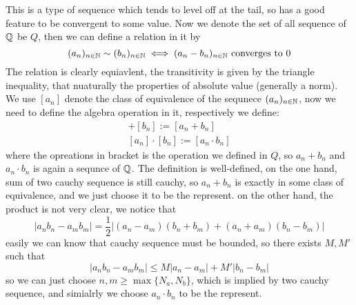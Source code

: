 \documentclass[en,geye,blue,pc,12pt]{elegantnote}
\begin{document}
This is a type of sequence which tends to level off at the tail, so has a good feature to be convergent to some value. Now we denote the set of all sequence of \(\mathbb{Q}\) be \(Q\), then we can define a relation in it by
\[(a_n)_{n \in \mathbb{N}} \sim (b_n)_{n \in \mathbb{N}} \iff (a_n-b_n)_{n \in \mathbb{N}} \text{ converges to 0}\]
The relation is clearly equiavlent, the transitivity is given by the triangle inequality, that nuaturally the properties of absolute value (generally a norm). We use \([a_n]\) denote the class of equivalence of the sequnece \((a_n)_{n \in \mathbb{N}}\), now we need to define the algebra operation in it, respectively we define:
\begin{align*}
  [a_n]+[b_n] := [a_n+b_n]\\
  [a_n]\cdot[b_n] := [a_n \cdot b_n]
\end{align*}
where the opreations in bracket is the operation we defined in \(Q\), so \(a_n+b_n\) and \(a_n \cdot b_n\) is again a sequnce of \(\mathbb{Q}\). The definition is well-defined, on the one hand, sum of two cauchy sequence is still cauchy, so \(a_n + b_n\) is exactly in some class of equivalence, and we just choose it to be the represent.  on the other hand, the product is not very clear, we notice that 
\[|a_nb_n-a_mb_m| = \frac{1}{2}|(a_n-a_m)(b_n+b_m)+(a_n+a_m)(b_n-b_m)|\]
easily we can know that cauchy sequence must be bounded, so there exists \(M,M'\) such that 
\[|a_nb_n-a_mb_m| \leq M|a_n-a_m|+M'|b_n-b_m|\]
so we can just choose \(n,m \geq \max\{N_a,N_b\}\), which is implied by two cauchy sequence, and simialrly we choose \(a_n \cdot b_n\) to be the represent.
\end{document}
